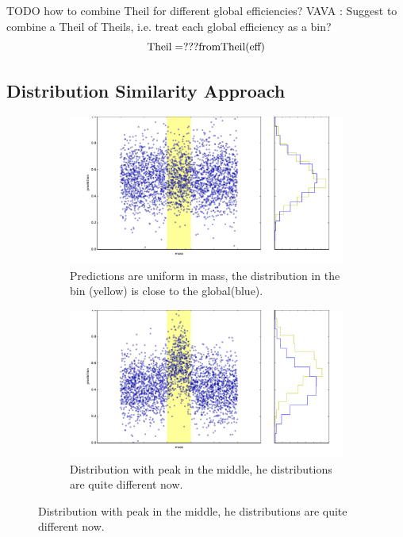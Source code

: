 TODO how to combine Theil for different global efficiencies?
VAVA : Suggest to combine a Theil of Theils, i.e. treat each global efficiency as a bin?
\[
	\text{Theil} = ??? \text{from} \text{Theil}(\text{eff})
\]

\subsection{Distribution Similarity Approach}
\label{sec:similarity}

\begin{figure}[H]
\label{fig:dsavisualization}
\centering
		\begin{subfigure}[b]{0.95\textwidth}
			\includegraphics[width=\textwidth]{graphs/bins_uniform_distribution.pdf}
			\caption{Predictions are uniform in mass, the distribution in the bin (yellow) is close to the global(blue).}
		\end{subfigure}
		\begin{subfigure}[b]{0.95\textwidth}
			\includegraphics[width=\textwidth]{graphs/bins_nonuniform_distribution.pdf}
			\caption{Distribution with peak in the middle, he distributions are quite different now.}
		\end{subfigure}
\end{figure}
